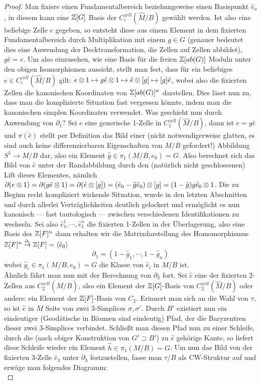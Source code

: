 \begin{proof}
	Man fixiere einen Fundamentalbereich beziehungsweise einen Basispunkt $\hat e_o$, in diesem kann eine $\mathbb{Z}[G]$ Basis der $C_i^{zell}(\widehat M/B)$ gewählt werden. Ist also eine beliebige Zelle $e$ gegeben, so entsteht diese aus einem Element in dem fixierten Fundamentalbereich durch Multiplikation mit einem $g\in G$ (genauer bedeutet dies eine Anwendung der Decktransformation, die Zellen auf Zellen abbildet), $g\hat e = e$. Um also einzusehen, wie eine Basis für die freien $\mathbb{Z}[ab(G)]$ Moduln unter den obigen Isomorphismen aussieht, stellt man fest, dass für ein beliebiges $e\in C_i^{zell}(\widehat M/B)$ gilt: $e\otimes 1 \mapsto g\hat e \otimes 1 \mapsto \hat e \otimes [g] \mapsto [g]\hat e $, wobei also die fixierten Zellen die kanonischen Koordinaten von $\mathbb{Z}[ab(G)]^n$ darstellen. Dies lässt nun zu, dass man die komplizierte Situation fast vergessen könnte, indem man die kanonischen simplen Koordinaten verwendet. Was geschieht nun durch Anwendung von $\partial_1$? Sei $e$ eine generische 1-Zelle in $C_1^{zell}(\widehat M/B)$, dann ist $e=g\hat e$ und $\overline{\pi(\hat e)}$ stellt per Definition das Bild einer (nicht notwendigerweise glatten, es sind auch keine differenzierbaren Eigenschaften von $M/B$ gefordert!) Abbildung $S^1 \to M/B$ dar, also ein Element $\hat g \in \pi_1(M/B,e_0) = G$. Also berechnet sich das Bild von $\hat e$ unter der Randabbildung durch den (natürlich nicht geschlossenen) Lift dieses Elementes, nämlich $\partial(e\otimes 1)=\partial(g \hat e \otimes 1) = \partial(\hat e \otimes [g])= (\hat e_0 - \hat g \hat e_0)\otimes [g]= (1-\hat g)g\hat e_0\otimes 1$. Die zu Beginn recht kompliziert wirkende Situation, wurde in den letzten Abschnitten und durch allerlei Verträglichkeiten deutlich gelockert und ermöglicht es nun kanonisch --- fast tautologisch --- zwischen verschiedenen Identifikationen zu wechseln. Sei also $\hat e_1^1 ,\cdots, \hat e_1^n$ die fixierten 1-Zellen in der Überlagerung, also eine Basis des $\mathbb{Z}[F]^n$ dann erhalten wir die Matrixdarstellung des Homomorphismus $\mathbb{Z}[F]^n \stackrel {\partial_1} \to \mathbb{Z}[F]=\langle \hat e_0\rangle$
	\[
		\partial_1 = (1-\hat g_1, \cdots , 1- \hat g_n)
	\]
	wobei $\hat g_i \in \pi_1(M/B,e_0)=G$ die Klasse von $\hat e_i$ in $M/B$ ist.\\
	Ähnlich fährt man nun mit der Berechnung von $\partial_3$ fort. Sei $\hat e$ eine der fixierten 2-Zellen aus $C_2^{zell}(\widehat M/B)$, also ein Element der $\mathbb{Z}[G]$-Basis von $C_2^{zell}(\widehat M/B)$ oder anders: ein Element der $\mathbb{Z}[F]$-Basis von $C_2$. Erinnert man sich an die Wahl von $\tau$, so ist $\hat e$ in $M$ Seite von zwei 3-Simplices $\sigma,\sigma'$. Durch $B'$ existiert nun ein eindeutiger (Geodätische in Bäumen sind eindeutig) Pfad, der die Baryzentren dieser zwei 3-Simplices verbindet.  Schließt man diesen Pfad nun zu einer Schleife, durch die (nach obiger Konstruktion von $G'\supset B'$) zu $\hat e$ gehörige Kante, so liefert diese Schleife wieder ein Element $\hat h \in \pi_1(M/B)=G$. Um nun das Bild von der fixierten 3-Zelle $\hat e_3$ unter $\partial_3$ festzustellen, fasse man $\tau/B$ als CW-Struktur auf und erwäge man folgendes Diagramm:\\

\end{proof}
